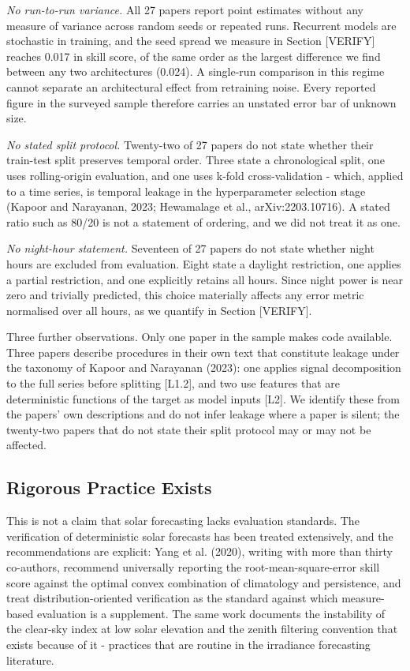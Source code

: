 \textit{No run-to-run variance.} All 27 papers report point estimates without
any measure of variance across random seeds or repeated runs. Recurrent
models are stochastic in training, and the seed spread we measure in
Section [VERIFY] reaches 0.017 in skill score, of the same order as the
largest difference we find between any two architectures (0.024). A
single-run comparison in this regime cannot separate an architectural
effect from retraining noise. Every reported figure in the
surveyed sample therefore carries an unstated error bar of unknown size.

\textit{No stated split protocol.} Twenty-two of 27 papers do not state whether
their train-test split preserves temporal order. Three state a
chronological split, one uses rolling-origin evaluation, and one uses
k-fold cross-validation - which, applied to a time series, is temporal
leakage in the hyperparameter selection stage (Kapoor and Narayanan, 2023;
Hewamalage et al., arXiv:2203.10716). A stated ratio such as 80/20 is not a statement of
ordering, and we did not treat it as one.

\textit{No night-hour statement.} Seventeen of 27 papers do not state whether
night hours are excluded from evaluation. Eight state a daylight
restriction, one applies a partial restriction, and one explicitly
retains all hours. Since night power is near zero and trivially
predicted, this choice materially affects any error metric normalised
over all hours, as we quantify in Section [VERIFY].

Three further observations. Only one paper in the sample makes code
available. Three papers describe procedures in their own text that
constitute leakage under the taxonomy of Kapoor and Narayanan (2023):
one applies signal decomposition to the full series before splitting
[L1.2], and two use features that are deterministic functions of the
target as model inputs [L2]. We identify these from the
papers' own descriptions and do not infer leakage where a paper is
silent; the twenty-two papers that do not state their split protocol may
or may not be affected.

\subsection{Rigorous Practice Exists}

This is not a claim that solar forecasting lacks evaluation standards.
The verification of deterministic solar forecasts has been treated
extensively, and the recommendations are explicit: Yang et al. (2020),
writing with more than thirty co-authors, recommend universally
reporting the root-mean-square-error skill score against the optimal
convex combination of climatology and persistence, and treat
distribution-oriented verification as the standard against which
measure-based evaluation is a supplement. The same work documents the
instability of the clear-sky index at low solar elevation and the zenith
filtering convention that exists because of it - practices that are
routine in the irradiance forecasting literature.

